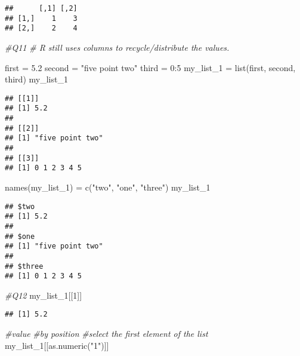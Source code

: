 \documentclass[
]{article}
\newenvironment{Shaded}{\begin{snugshade}}{\end{snugshade}}
\newcommand{\CommentTok}[1]{\textcolor[rgb]{0.56,0.35,0.01}{\textit{#1}}}
\newcommand{\DecValTok}[1]{\textcolor[rgb]{0.00,0.00,0.81}{#1}}
\newcommand{\FloatTok}[1]{\textcolor[rgb]{0.00,0.00,0.81}{#1}}
\newcommand{\FunctionTok}[1]{\textcolor[rgb]{0.00,0.00,0.00}{#1}}
\newcommand{\NormalTok}[1]{#1}
\newcommand{\OtherTok}[1]{\textcolor[rgb]{0.56,0.35,0.01}{#1}}
\newcommand{\SpecialCharTok}[1]{\textcolor[rgb]{0.00,0.00,0.00}{#1}}
\newcommand{\StringTok}[1]{\textcolor[rgb]{0.31,0.60,0.02}{#1}}
\begin{document}
\begin{verbatim}
##      [,1] [,2]
## [1,]    1    3
## [2,]    2    4
\end{verbatim}

\begin{Shaded}
\begin{Highlighting}[]
\CommentTok{\#Q11}
\CommentTok{\# R still uses columns to recycle/distribute the values.}

\NormalTok{first }\OtherTok{=} \FloatTok{5.2}
\NormalTok{second }\OtherTok{=} \StringTok{"five point two"}
\NormalTok{third }\OtherTok{=} \DecValTok{0}\SpecialCharTok{:}\DecValTok{5}
\NormalTok{my\_list\_1 }\OtherTok{=} \FunctionTok{list}\NormalTok{(first, second, third)}
\NormalTok{my\_list\_1}
\end{Highlighting}
\end{Shaded}

\begin{verbatim}
## [[1]]
## [1] 5.2
## 
## [[2]]
## [1] "five point two"
## 
## [[3]]
## [1] 0 1 2 3 4 5
\end{verbatim}

\begin{Shaded}
\begin{Highlighting}[]
\FunctionTok{names}\NormalTok{(my\_list\_1) }\OtherTok{=} \FunctionTok{c}\NormalTok{(}\StringTok{"two"}\NormalTok{, }\StringTok{"one"}\NormalTok{, }\StringTok{"three"}\NormalTok{)}
\NormalTok{my\_list\_1}
\end{Highlighting}
\end{Shaded}

\begin{verbatim}
## $two
## [1] 5.2
## 
## $one
## [1] "five point two"
## 
## $three
## [1] 0 1 2 3 4 5
\end{verbatim}

\begin{Shaded}
\begin{Highlighting}[]
\CommentTok{\#Q12}
\NormalTok{my\_list\_1[[}\DecValTok{1}\NormalTok{]] }
\end{Highlighting}
\end{Shaded}

\begin{verbatim}
## [1] 5.2
\end{verbatim}

\begin{Shaded}
\begin{Highlighting}[]
\CommentTok{\#value}
\CommentTok{\#by position}
\CommentTok{\#select the first element of the list}
\NormalTok{my\_list\_1[[}\FunctionTok{as.numeric}\NormalTok{(}\StringTok{"1"}\NormalTok{)]] }
\end{Highlighting}
\end{Shaded}
\end{document}
